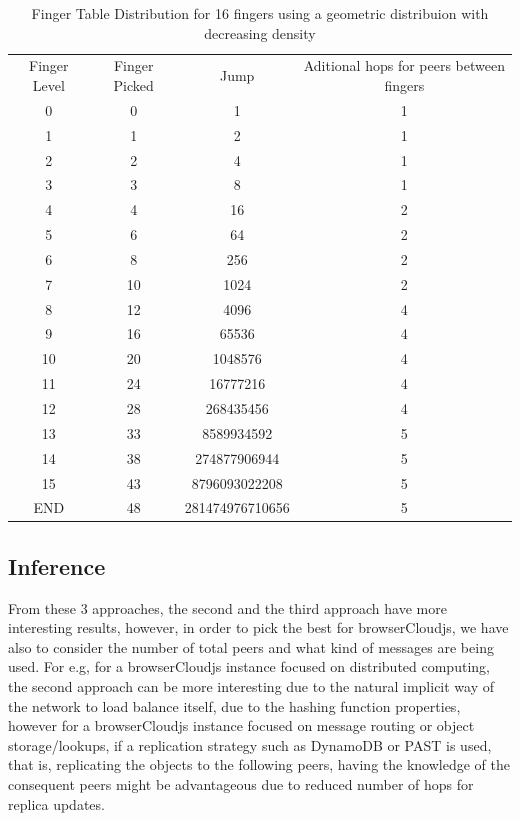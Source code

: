 \begin{table}
    \centering
    \begin{tabular}{| c | c | c | c |}
    \hline
        Finger Level &  Finger Picked & Jump & Aditional hops for peers between fingers \\
        0 & 0 & 1 & 1 \\
        1 & 1 & 2 & 1 \\
        2 & 2 & 4 & 1 \\
        3 & 3 & 8 & 1 \\
        4 & 4 & 16 & 2 \\
        5 & 6 & 64 & 2 \\
        6 & 8 & 256 & 2 \\
        7 & 10 & 1024 & 2 \\
        8 & 12 & 4096 & 4 \\
        9 & 16 & 65536 & 4 \\
        10 & 20 & 1048576 & 4 \\
        11 & 24 & 16777216 & 4 \\
        12 & 28 & 268435456 & 4 \\
        13 & 33 & 8589934592 & 5 \\
        14 & 38 & 274877906944 & 5 \\
        15 & 43 & 8796093022208 & 5 \\
        END & 48 & 281474976710656 & 5 \\
    \hline
    \end{tabular}
    \caption{Finger Table Distribution for 16 fingers using a geometric distribuion with decreasing density}
    \label{tbl:table-c}
\end{table}

\subsection{Inference}

From these 3 approaches, the second and the third approach have more interesting results, however, in order to pick the best for browserCloudjs, we have also to consider the number of total peers and what kind of messages are being used. For e.g, for a browserCloudjs instance focused on distributed computing, the second approach can be more interesting due to the natural implicit way of the network to load balance itself, due to the hashing function properties, however for a browserCloudjs instance focused on message routing or object storage/lookups, if a replication strategy such as DynamoDB or PAST is used, that is, replicating the objects to the following peers, having the knowledge of the consequent peers might be advantageous due to reduced number of hops for replica updates.

